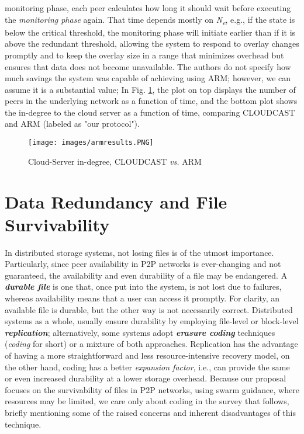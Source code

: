 \documentclass[runningheads]{llncs}
\begin{document}
monitoring phase, each peer calculates how long it should wait before executing the \textit{monitoring phase} again. That time depends mostly on \textit{N\textsubscript{e}}, e.g., if the state is below the critical threshold, the monitoring phase will initiate earlier than if it is above the redundant threshold, allowing the system to respond to overlay changes promptly and to keep the overlay size in a range that minimizes overhead but ensures that data does not become unavailable. The authors do not specify how much savings the system was capable of achieving using ARM; however, we can assume it is a substantial value; In Fig. \ref{fig:arm_results}, the plot on top displays the number of peers in the underlying network as a function of time, and the bottom plot shows the in-degree to the cloud server as a function of time, comparing CLOUDCAST and ARM (labeled as "our protocol").

\begin{figure}[!ht]
\centering
\texttt{[image: images/armresults.PNG]}
\caption{Cloud-Server in-degree, CLOUDCAST \textit{vs.} ARM \cite{marriage_of_convinience}}
\label{fig:arm_results}
\end{figure}

\newpage\section{Data Redundancy and File Survivability}\label{sec:dataredundancy}
In distributed storage systems, not losing files is of the utmost importance. Particularly, since peer availability in P2P networks is ever-changing and not guaranteed, the availability and even durability of a file may be endangered. A \textbf{\textit{durable file}} is one that, once put into the system, is not lost due to failures, whereas availability means that a user can access it promptly. For clarity, an available file is durable, but the other way is not necessarily correct. Distributed systems as a whole, usually ensure durability by employing file-level or block-level \textbf{\textit{replication}}; alternatively, some systems adopt \textbf{\textit{erasure coding}} techniques (\textit{coding} for short) or a mixture of both approaches. Replication has the advantage of having a more straightforward and less resource-intensive recovery model, on the other hand, coding has a better \textit{expansion factor}, i.e., can provide the same or even increased durability at a lower storage overhead. Because our proposal focuses on the survivability of files in P2P networks, using swarm guidance, where resources may be limited, we care only about coding in the survey that follows, briefly mentioning some of the raised concerns and inherent disadvantages of this technique.
\end{document}
